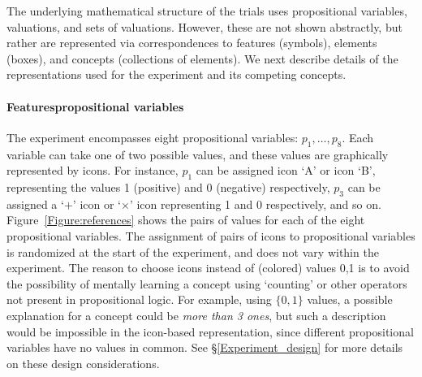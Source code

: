 The underlying mathematical structure of the trials uses propositional variables, valuations, and sets of valuations. However, these are not shown abstractly, but rather are represented via correspondences to features (symbols), elements (boxes), and concepts (collections of elements). 
We next describe details of the representations used for the experiment and its competing concepts.

\paragraph{Features\textemdash propositional variables}
The experiment encompasses eight propositional variables: $p_1,\dots,p_8$. Each variable can take one of two possible values, and these values are graphically represented by icons. \color{blue} For instance, $p_1$ can be assigned icon `A' or icon `B', representing the values 1 (positive) and 0 (negative) respectively, $p_3$ can be assigned a `$+$' icon or `$\times$' icon  representing 1 and 0 respectively, and so on. \color{black}
Figure~\ref{Figure:references} shows the pairs of values for each of the eight propositional variables. The assignment of pairs of icons to propositional variables is randomized at the start of the experiment, and does not vary within the experiment. 
The reason to choose icons instead of (colored) values 0,1 is to avoid the possibility of mentally learning a concept using `counting' or other operators not present in propositional logic. For example, using $\{0,1\}$ values, a possible explanation for a concept could be {\em more than 3 ones}, but such a description would be impossible in the icon-based representation, since different propositional variables have no values in common. See \S\ref{Experiment_design} for more details on these design considerations.

